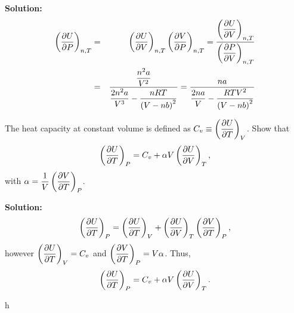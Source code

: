 \begin{list}{\bf Example :~}{}
\medskip
{\bf Solution:}
   \begin{eqnarray}
      \Partial[U]{P}{n,T} &=& \Partial[U]{V}{n,T}\Partial[V]{P}{n,T} = \frc{\Partial[U]{V}{n,T}}{\Partial[P]{V}{n,T}} \nonumber \\
                          &=& \frc{\frc{n^{2}a}{V^{2}}}{\frc{2n^{2}a}{V^{3}}-\frc{n R T}{\left(V-nb\right)^{2}}} = \frc{n a}{\frc{2 n a}{V}-\frc{R T V^{2}}{\left(V-nb\right)^{2}}}\nonumber
   \end{eqnarray}
      
%
     \item\label{example3} The heat capacity at constant volume is defined as $C_{v}\equiv \Partial[U]{T}{V}$. Show that
       \begin{displaymath}
          \Partial[U]{T}{P} = C_{v} + \alpha V\Partial[U]{V}{T},
       \end{displaymath}
       with $\alpha=\frc{1}{V}\Partial[V]{T}{P}$.

%
\medskip
       {\bf Solution:}
          \begin{displaymath}
            \Partial[U]{T}{P} = \Partial[U]{T}{V} + \Partial[U]{V}{T}\Partial[V]{T}{P},
          \end{displaymath}
          however $\Partial[U]{T}{V}=C_{v}$ and $\Partial[V]{T}{P}=V\alpha$. Thus,
          \begin{displaymath}
             \Partial[U]{T}{P} = C_{v} + \alpha V\Partial[U]{V}{T}.
          \end{displaymath}

%
     \item\label{example4} h
%
\end{list}
